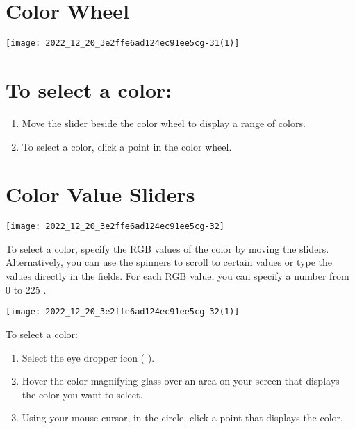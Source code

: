 \section{Color Wheel}
\begin{center}
\texttt{[image: 2022\_12\_20\_3e2ffe6ad124ec91ee5cg-31(1)]}
\end{center}

\section{To select a color:}
\begin{enumerate}
  \item Move the slider beside the color wheel to display a range of colors.

  \item To select a color, click a point in the color wheel.

\end{enumerate}

\section{Color Value Sliders}
\begin{center}
\texttt{[image: 2022\_12\_20\_3e2ffe6ad124ec91ee5cg-32]}
\end{center}

To select a color, specify the RGB values of the color by moving the sliders. Alternatively, you can use the spinners to scroll to certain values or type the values directly in the fields. For each RGB value, you can specify a number from 0 to 225 .

\begin{center}
\texttt{[image: 2022\_12\_20\_3e2ffe6ad124ec91ee5cg-32(1)]}
\end{center}

To select a color:

\begin{enumerate}
  \item Select the eye dropper icon ( ).

  \item Hover the color magnifying glass over an area on your screen that displays the color you want to select.

  \item Using your mouse cursor, in the circle, click a point that displays the color.

\end{enumerate}

